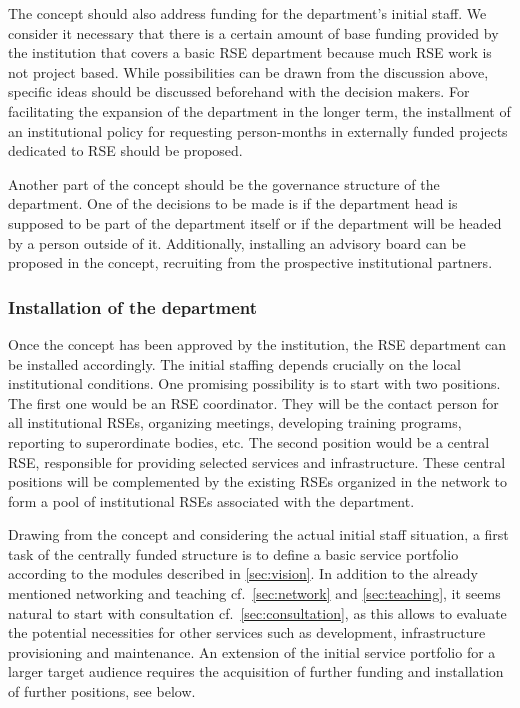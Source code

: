 \documentclass[a4paper]{article}
\begin{document}
The concept should also address funding for the department's initial staff.
We consider it necessary that there is a certain amount of base funding provided by the institution that covers a basic RSE department because much RSE work is not project based.
While possibilities can be drawn from the discussion above, specific ideas should be discussed beforehand with the decision makers.
For facilitating the expansion of the department in the longer term, the installment of an institutional policy for requesting person-months in externally funded projects dedicated to RSE should be proposed.

Another part of the concept should be the governance structure of the department.
One of the decisions to be made is if the department head is supposed to be part of the department itself or if the department will be headed by a person outside of it.
Additionally, installing an advisory board can be proposed in the concept, recruiting from the prospective institutional partners.

\subsubsection{Installation of the department}
Once the concept has been approved by the institution, the RSE department can be installed accordingly.
The initial staffing depends crucially on the local institutional conditions. 
One promising possibility is to start with two positions. The first one would be an RSE coordinator.
They will be the contact person for all institutional RSEs, organizing meetings, developing training programs, reporting to superordinate bodies, etc.
The second position would be a central RSE, responsible for providing selected services and infrastructure.
These central positions will be complemented by the existing RSEs organized in the network to form a pool of institutional RSEs associated with the department.

Drawing from the concept and considering the actual initial staff situation, a first task of the centrally funded structure is to define a basic service portfolio according to the modules described in \autoref{sec:vision}.
In addition to the already mentioned networking and teaching cf.~\autoref{sec:network} and \autoref{sec:teaching}, it seems natural to start with consultation cf.~\autoref{sec:consultation},
as this allows to evaluate the potential necessities for other services such as development, infrastructure provisioning and maintenance.
An extension of the initial service portfolio for a larger target audience requires the acquisition of further funding and installation of further positions, see below.
\end{document}
